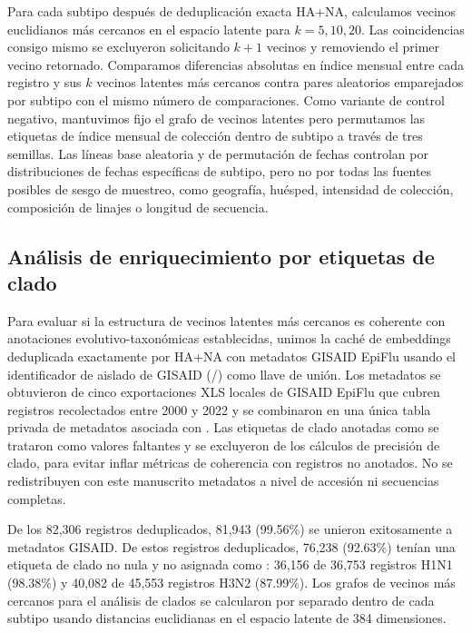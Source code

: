 \documentclass[11pt]{article}
\begin{document}
Para cada subtipo después de deduplicación exacta HA+NA, calculamos vecinos euclidianos más cercanos en el espacio latente para $k=5,10,20$. Las coincidencias consigo mismo se excluyeron solicitando $k+1$ vecinos y removiendo el primer vecino retornado. Comparamos diferencias absolutas en índice mensual entre cada registro y sus $k$ vecinos latentes más cercanos contra pares aleatorios emparejados por subtipo con el mismo número de comparaciones. Como variante de control negativo, mantuvimos fijo el grafo de vecinos latentes pero permutamos las etiquetas de índice mensual de colección dentro de subtipo a través de tres semillas. Las líneas base aleatoria y de permutación de fechas controlan por distribuciones de fechas específicas de subtipo, pero no por todas las fuentes posibles de sesgo de muestreo, como geografía, huésped, intensidad de colección, composición de linajes o longitud de secuencia.

\subsection{Análisis de enriquecimiento por etiquetas de clado}

Para evaluar si la estructura de vecinos latentes más cercanos es coherente con anotaciones evolutivo-taxonómicas establecidas, unimos la caché de embeddings deduplicada exactamente por HA+NA con metadatos GISAID EpiFlu usando el identificador de aislado de GISAID (/) como llave de unión. Los metadatos se obtuvieron de cinco exportaciones XLS locales de GISAID EpiFlu que cubren registros recolectados entre 2000 y 2022 y se combinaron en una única tabla privada de metadatos asociada con . Las etiquetas de clado anotadas como  se trataron como valores faltantes y se excluyeron de los cálculos de precisión de clado, para evitar inflar métricas de coherencia con registros no anotados. No se redistribuyen con este manuscrito metadatos a nivel de accesión ni secuencias completas.

De los 82,306 registros deduplicados, 81,943 (99.56\%) se unieron exitosamente a metadatos GISAID. De estos registros deduplicados, 76,238 (92.63\%) tenían una etiqueta de clado no nula y no asignada como : 36,156 de 36,753 registros H1N1 (98.38\%) y 40,082 de 45,553 registros H3N2 (87.99\%). Los grafos de vecinos más cercanos para el análisis de clados se calcularon por separado dentro de cada subtipo usando distancias euclidianas en el espacio latente de 384 dimensiones.
\end{document}
